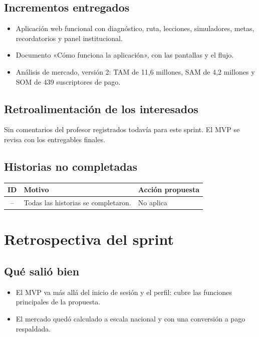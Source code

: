 \documentclass[11pt,a4paper]{article}
\begin{document}
\subsection{Incrementos entregados}
\begin{itemize}[leftmargin=1.5em]
  \item {Aplicación web funcional con diagnóstico, ruta, lecciones, simuladores, metas, recordatorios y panel institucional.}
  \item {Documento «Cómo funciona la aplicación», con las pantallas y el flujo.}
  \item {Análisis de mercado, versión 2: TAM de 11,6 millones, SAM de 4,2 millones y SOM de 439 suscriptores de pago.}
\end{itemize}

\subsection{Retroalimentación de los interesados}
{Sin comentarios del profesor registrados todavía para este sprint. El MVP se revisa con los entregables finales.}

\subsection{Historias no completadas}
\begin{tabularx}{\textwidth}{c X X}
  \toprule
  \textbf{ID} & \textbf{Motivo} & \textbf{Acción propuesta} \\
  \midrule
  -- & Todas las historias se completaron. & No aplica \\
  \bottomrule
\end{tabularx}

\section{Retrospectiva del sprint}

\subsection{Qué salió bien}
\begin{itemize}[leftmargin=1.5em]
  \item {El MVP va más allá del inicio de sesión y el perfil: cubre las funciones principales de la propuesta.}
  \item {El mercado quedó calculado a escala nacional y con una conversión a pago respaldada.}
\end{itemize}
\end{document}
